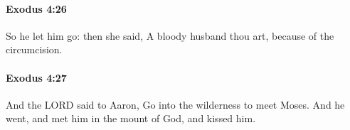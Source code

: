 		\paragraph{Exodus 4:26} %
			\label{EXODUS-4-26}

			So he let him go: then she said, A bloody husband thou art, because of the circumcision.


		\paragraph{Exodus 4:27} %
			\label{EXODUS-4-27}

			And the LORD said to Aaron, Go into the wilderness to meet Moses. And he went, and met him in the mount of God, and kissed him.


